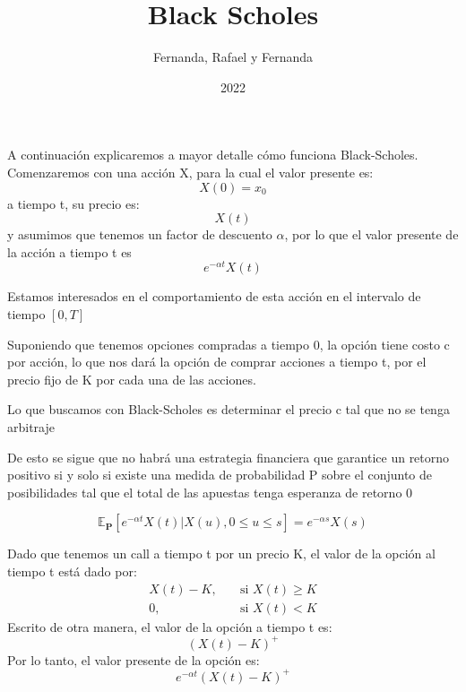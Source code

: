\documentclass{beamer}
\title{Black Scholes}
\author{Fernanda, Rafael y Fernanda}
\institute{ITAM}
\date{2022}
\begin{document}
\frame{\titlepage}

\begin{frame}
A continuación explicaremos a mayor detalle cómo funciona Black-Scholes.
Comenzaremos con una acción X, para la cual el valor presente es:
\begin{equation*}
X(0) = x_{0}
\end{equation*}
a tiempo t, su precio es:
\begin{equation*}
X(t)
\end{equation*}
y asumimos que tenemos un factor de descuento $\alpha$, por lo que el valor presente de la acción a tiempo t es
\begin{equation*}
	e^{-\alpha t}X(t)
\end{equation*}
\end{frame}

\begin{frame}
	Estamos interesados en el comportamiento de esta acción en el intervalo de tiempo $[0,T]$\par
	Suponiendo que tenemos opciones compradas a tiempo 0, la opción tiene costo c por acción, lo que nos dará la opción de comprar acciones a tiempo t, por el precio fijo de K por cada una de las acciones.\par
	Lo que buscamos con Black-Scholes es determinar el precio c tal que no se tenga arbitraje
\end{frame}

\begin{frame}
	De esto se sigue que no habrá una estrategia financiera que garantice un retorno positivo si y solo si existe una medida de probabilidad P sobre el conjunto de posibilidades tal que el total de las apuestas tenga esperanza de retorno 0

\begin{equation} \label{eq:1}
\mathbb{E}_{\textbf{P}}[e^{-\alpha t} X(t) | X(u), 0 \leq u \leq s] = e^{-\alpha s} X(s)
\end{equation}
\end{frame}

\begin{frame}
Dado que tenemos un call a tiempo t por un precio K, el valor de la opción al tiempo t está dado por:
\begin{align*}
	X(t) - K, \quad &\text{si } X(t) \ge K\\
        0,  \quad &\text{si } X(t) < K
\end{align*}
Escrito de otra manera, el valor de la opción a tiempo t es:
\begin{equation*}
\left( X(t) - K \right)^{+}
\end{equation*}
Por lo tanto, el valor presente de la opción es:
\begin{equation*}
e^{-\alpha t}\left( X(t) - K \right)^{+}
\end{equation*}
\end{frame}
\end{document}
